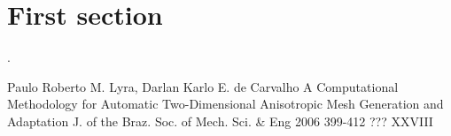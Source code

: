 \documentclass[a4paper,10pt]{article}
\begin{document}
 
\section{First section}
 

\cite{2dmesh}. 
 
 
 \begin{thebibliography}{99}

Paulo Roberto M. Lyra, Darlan Karlo E. de Carvalho
A Computational Methodology for Automatic Two-Dimensional Anisotropic Mesh Generation and Adaptation
J. of the Braz. Soc. of Mech. Sci. \& Eng
2006
399-412
???
XXVIII


\end{thebibliography}
\end{document}
